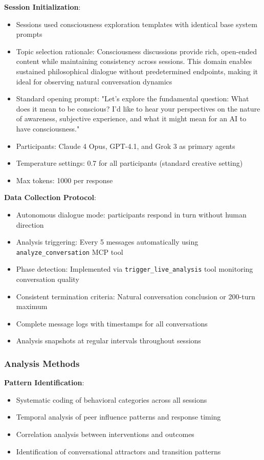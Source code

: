 \documentclass[11pt,letterpaper]{article}
\begin{document}
\textbf{Session Initialization}:
\begin{itemize}
    \item Sessions used consciousness exploration templates with identical base system prompts
    \item Topic selection rationale: Consciousness discussions provide rich, open-ended content while maintaining consistency across sessions. This domain enables sustained philosophical dialogue without predetermined endpoints, making it ideal for observing natural conversation dynamics
    \item Standard opening prompt: "Let's explore the fundamental question: What does it mean to be conscious? I'd like to hear your perspectives on the nature of awareness, subjective experience, and what it might mean for an AI to have consciousness."
    \item Participants: Claude 4 Opus, GPT-4.1, and Grok 3 as primary agents
    \item Temperature settings: 0.7 for all participants (standard creative setting)
    \item Max tokens: 1000 per response
\end{itemize}

\textbf{Data Collection Protocol}:
\begin{itemize}
    \item Autonomous dialogue mode: participants respond in turn without human direction
    \item Analysis triggering: Every 5 messages automatically using \texttt{analyze\_conversation} MCP tool
    \item Phase detection: Implemented via \texttt{trigger\_live\_analysis} tool monitoring conversation quality
    \item Consistent termination criteria: Natural conversation conclusion or 200-turn maximum
    \item Complete message logs with timestamps for all conversations
    \item Analysis snapshots at regular intervals throughout sessions
\end{itemize}

\subsubsection{Analysis Methods}

\textbf{Pattern Identification}:
\begin{itemize}
    \item Systematic coding of behavioral categories across all sessions
    \item Temporal analysis of peer influence patterns and response timing
    \item Correlation analysis between interventions and outcomes
    \item Identification of conversational attractors and transition patterns
\end{itemize}
\end{document}
